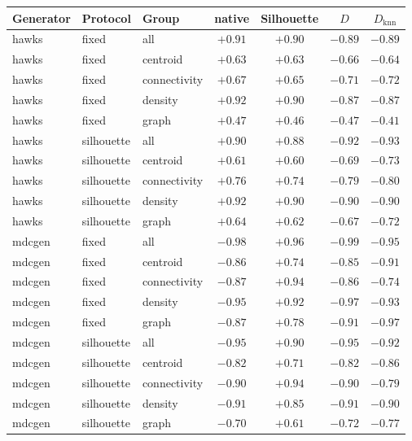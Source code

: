 \begin{tabular}{@{}lllcccc@{}}
\toprule
Generator & Protocol & Group & native & Silhouette & $D$ & $D_{\text{knn}}$ \\
\midrule
hawks & fixed & all & $+0.91$ & $+0.90$ & $-0.89$ & $-0.89$ \\
hawks & fixed & centroid & $+0.63$ & $+0.63$ & $-0.66$ & $-0.64$ \\
hawks & fixed & connectivity & $+0.67$ & $+0.65$ & $-0.71$ & $-0.72$ \\
hawks & fixed & density & $+0.92$ & $+0.90$ & $-0.87$ & $-0.87$ \\
hawks & fixed & graph & $+0.47$ & $+0.46$ & $-0.47$ & $-0.41$ \\
hawks & silhouette & all & $+0.90$ & $+0.88$ & $-0.92$ & $-0.93$ \\
hawks & silhouette & centroid & $+0.61$ & $+0.60$ & $-0.69$ & $-0.73$ \\
hawks & silhouette & connectivity & $+0.76$ & $+0.74$ & $-0.79$ & $-0.80$ \\
hawks & silhouette & density & $+0.92$ & $+0.90$ & $-0.90$ & $-0.90$ \\
hawks & silhouette & graph & $+0.64$ & $+0.62$ & $-0.67$ & $-0.72$ \\
mdcgen & fixed & all & $-0.98$ & $+0.96$ & $-0.99$ & $-0.95$ \\
mdcgen & fixed & centroid & $-0.86$ & $+0.74$ & $-0.85$ & $-0.91$ \\
mdcgen & fixed & connectivity & $-0.87$ & $+0.94$ & $-0.86$ & $-0.74$ \\
mdcgen & fixed & density & $-0.95$ & $+0.92$ & $-0.97$ & $-0.93$ \\
mdcgen & fixed & graph & $-0.87$ & $+0.78$ & $-0.91$ & $-0.97$ \\
mdcgen & silhouette & all & $-0.95$ & $+0.90$ & $-0.95$ & $-0.92$ \\
mdcgen & silhouette & centroid & $-0.82$ & $+0.71$ & $-0.82$ & $-0.86$ \\
mdcgen & silhouette & connectivity & $-0.90$ & $+0.94$ & $-0.90$ & $-0.79$ \\
mdcgen & silhouette & density & $-0.91$ & $+0.85$ & $-0.91$ & $-0.90$ \\
mdcgen & silhouette & graph & $-0.70$ & $+0.61$ & $-0.72$ & $-0.77$ \\
\bottomrule
\end{tabular}
